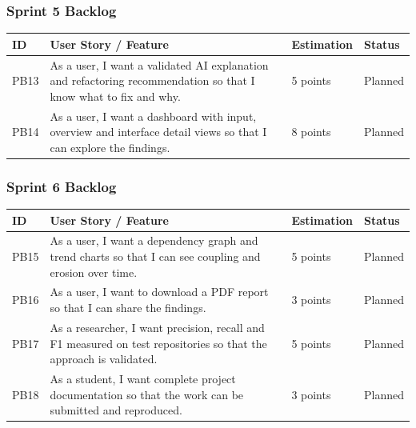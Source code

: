 \documentclass[12pt,a4paper]{article}
\begin{document}
\subsubsection{Sprint 5 Backlog}

\begin{table}[H]
\centering
\renewcommand{\arraystretch}{1.4}
\setlength{\tabcolsep}{4pt}

\begin{tabular}{|L{0.45in}|L{3.0in}|L{0.85in}|L{0.75in}|}
\hline
\textbf{ID} & \textbf{User Story / Feature} & \textbf{Estimation} & \textbf{Status} \\
\hline
PB13 & As a user, I want a validated AI explanation and refactoring recommendation so that I know what to fix and why. & 5 points & Planned \\
\hline
PB14 & As a user, I want a dashboard with input, overview and interface detail views so that I can explore the findings. & 8 points & Planned \\
\hline
\end{tabular}
\end{table}

\subsubsection{Sprint 6 Backlog}

\begin{table}[H]
\centering
\renewcommand{\arraystretch}{1.4}
\setlength{\tabcolsep}{4pt}

\begin{tabular}{|L{0.45in}|L{3.0in}|L{0.85in}|L{0.75in}|}
\hline
\textbf{ID} & \textbf{User Story / Feature} & \textbf{Estimation} & \textbf{Status} \\
\hline
PB15 & As a user, I want a dependency graph and trend charts so that I can see coupling and erosion over time. & 5 points & Planned \\
\hline
PB16 & As a user, I want to download a PDF report so that I can share the findings. & 3 points & Planned \\
\hline
PB17 & As a researcher, I want precision, recall and F1 measured on test repositories so that the approach is validated. & 5 points & Planned \\
\hline
PB18 & As a student, I want complete project documentation so that the work can be submitted and reproduced. & 3 points & Planned \\
\hline
\end{tabular}
\end{table}
\end{document}
